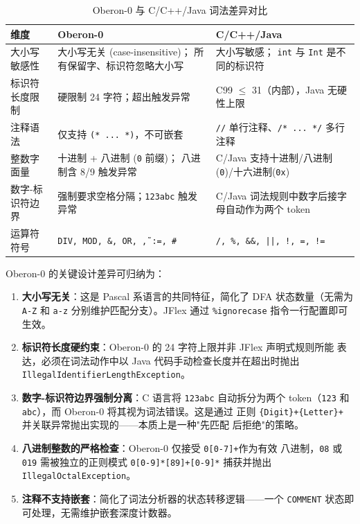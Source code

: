 \documentclass[a4paper]{article}
\begin{document}
\begin{table}[H]
\centering
\caption{Oberon-0 与 C/C++/Java 词法差异对比}
\label{tab:lex-compare}
\begin{tabular}{@{}p{4cm}p{5.2cm}p{5.2cm}@{}}
\toprule
\textbf{维度} & \textbf{Oberon-0} & \textbf{C/C++/Java} \\
\midrule
大小写敏感性 & 大小写无关 (case-insensitive)；
所有保留字、标识符忽略大小写 &
大小写敏感；
\texttt{int} 与 \texttt{Int} 是不同的标识符 \\
\midrule
标识符长度限制 & 硬限制 24 字符；超出触发异常 &
C99 $\leq$ 31（内部），Java 无硬性上限 \\
\midrule
注释语法 & 仅支持 \texttt{(* ... *)}，不可嵌套 &
\texttt{//} 单行注释、\texttt{/* ... */} 多行注释 \\
\midrule
整数字面量 & 十进制 + 八进制 (\texttt{0} 前缀)；
八进制含 8/9 触发异常 &
C/Java 支持十进制/八进制(\texttt{0})/十六进制(\texttt{0x}) \\
\midrule
数字-标识符边界 & 强制要求空格分隔；\texttt{123abc} 触发异常 &
C/Java 词法规则中数字后接字母自动作为两个 token \\
\midrule
运算符符号 & \texttt{DIV, MOD, \&, OR, \~, :=, \#} &
\texttt{/, \%, \&\&, ||, !, =, !=} \\
\bottomrule
\end{tabular}
\end{table}

Oberon-0 的关键设计差异可归纳为：

\begin{enumerate}
    \item \textbf{大小写无关}：这是 Pascal 系语言的共同特征，简化了 DFA 状态数量（无需为
    \texttt{A-Z} 和 \texttt{a-z} 分别维护匹配分支）。JFlex 通过 \texttt{\%ignorecase}
    指令一行配置即可生效。

    \item \textbf{标识符长度硬约束}：Oberon-0 的 24 字符上限并非 JFlex 声明式规则所能
    表达，必须在词法动作中以 Java 代码手动检查长度并在超出时抛出
    \texttt{IllegalIdentifierLengthException}。

    \item \textbf{数字-标识符边界强制分离}：C 语言将 \texttt{123abc} 自动拆分为两个
    token（\texttt{123} 和 \texttt{abc}），而 Oberon-0 将其视为词法错误。这是通过
    正则 \texttt{\{Digit\}+\{Letter\}+} 并关联异常抛出实现的——本质上是一种"先匹配
    后拒绝"的策略。

    \item \textbf{八进制整数的严格检查}：Oberon-0 仅接受 \texttt{0[0-7]+}作为有效
    八进制，\texttt{08} 或 \texttt{019} 需被独立的正则模式
    \texttt{0[0-9]*[89]+[0-9]*} 捕获并抛出 \texttt{IllegalOctalException}。

    \item \textbf{注释不支持嵌套}：简化了词法分析器的状态转移逻辑——一个 \texttt{COMMENT}
    状态即可处理，无需维护嵌套深度计数器。
\end{enumerate}
\end{document}

